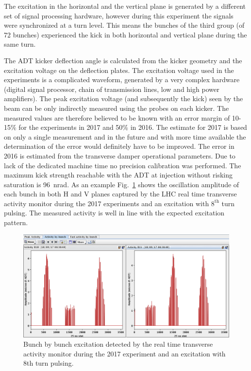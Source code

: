 \documentclass[%
 reprint,
 amsmath,amssymb,
 aps,
prstab,
longbibliography,
]{revtex4-1}
\begin{document}
The excitation in the horizontal and the vertical plane is generated by a different set of signal processing hardware, however during this experiment the signals were synchronized at a turn level. This means the bunches of the third group (of 72 bunches) experienced the kick in both horizontal and vertical plane during the same turn.

The ADT kicker deflection angle is calculated from the kicker geometry and the excitation voltage on the deflection plates. The excitation voltage used in the experiments is a complicated waveform, generated by a very complex hardware (digital signal processor, chain of transmission lines, low and high power amplifiers). The peak excitation voltage (and subsequently the kick) seen by the beam can be only indirectly measured using the probes on each kicker. The measured values are therefore believed to be known with an error margin of 10-15\% for the experiments in 2017 and 50\% in 2016. The estimate for 2017 is based on only a single measurement and in the future and with more time available the determination of the error would definitely have to be improved. The error in 2016 is estimated from the transverse damper operational parameters. Due to lack of the dedicated machine time no precision calibration was performed. The maximum kick strength reachable with the ADT at injection without risking saturation is 96~nrad. As an example Fig.~\ref{fig:fill_meas} shows the oscillation amplitude of each bunch in both H and V planes captured by the LHC real time transverse activity monitor during the 2017 experiments and an excitation with $8^{\mathrm{th}}$ turn pulsing. The measured activity is well in line with the expected excitation pattern.
\begin{figure}[h]
	\centering
	\includegraphics[width=1.0\linewidth]{bunchfilling_measured.png}	
	\caption{\label{fig:fill_meas} Bunch by bunch excitation detected by the real time transverse activity monitor during the 2017 experiment and an excitation with 8th turn pulsing.}
\end{figure}
\end{document}
